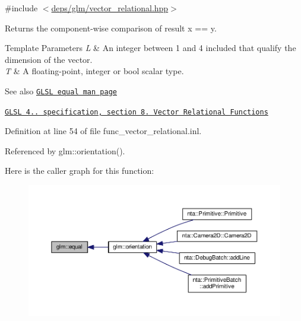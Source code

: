{\ttfamily \#include $<$\hyperlink{vector__relational_8hpp}{deps/glm/vector\+\_\+relational.\+hpp}$>$}

Returns the component-\/wise comparison of result x == y.


\begin{DoxyTemplParams}{Template Parameters}
{\em L} & An integer between 1 and 4 included that qualify the dimension of the vector. \\
\hline
{\em T} & A floating-\/point, integer or bool scalar type.\\
\hline
\end{DoxyTemplParams}
\begin{DoxySeeAlso}{See also}
\href{http://www.opengl.org/sdk/docs/manglsl/xhtml/equal.xml}{\tt G\+L\+SL equal man page} 

\href{http://www.opengl.org/registry/doc/GLSLangSpec.4.20.8.pdf}{\tt G\+L\+SL 4.. specification, section 8. Vector Relational Functions} 
\end{DoxySeeAlso}


Definition at line 54 of file func\+\_\+vector\+\_\+relational.\+inl.



Referenced by glm\+::orientation().

Here is the caller graph for this function\+:
\nopagebreak
\begin{figure}[H]
\begin{center}
\leavevmode
\includegraphics[width=350pt]{d8/d06/group__core__func__vector__relational_ga774f9e3a93c913f1e7c215a549707d59_icgraph}
\end{center}
\end{figure}
\mbox{\label{group__core__func__vector__relational_gad3a3a7d228da3754c328c9a778f6df56}} 
